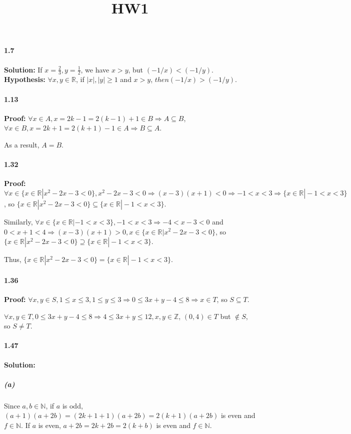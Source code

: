 \documentclass[11pt]{report}
\title{HW1}
\begin{document}
\paragraph{1.7}\textbf{Solution:} If $x = \frac{2}{3}, y = \frac{1}{2}$, we have $x > y$, but $(-1/x) < (-1/y)$.\\

\textbf{Hypothesis:} $\forall x, y \in \mathbb{R}$, if $|x|, |y| \geq 1$ and $x > y$, $then (-1/x) > (-1/y)$.

\paragraph{1.13}\textbf{Proof:}
    $\forall x \in A, x = 2k - 1 = 2(k-1) + 1 \in B \Rightarrow A \subseteq B$, $\forall x \in B, x = 2k + 1 = 2(k + 1) - 1 \in A \Rightarrow B \subseteq A$.
    
    As a result, $A = B$.
\paragraph{1.32}\textbf{Proof:} $\forall x \in \{x \in \mathbb{R} | x^2-2x-3 < 0\}, x^2 - 2x -3 < 0 \Rightarrow (x-3)(x+1) < 0 \Rightarrow -1 < x < 3 \Rightarrow \{x \in \mathbb{R} | -1 < x < 3\}$, so $\{x \in \mathbb{R} | x^2-2x-3 < 0\} \subseteq  \{x \in \mathbb{R} | -1 < x < 3\}$. 

Similarly, $\forall x \in \{x \in \mathbb{R} | -1 < x < 3\}, -1 < x < 3 \Rightarrow  -4 < x-3 < 0$ and $0 < x+1 < 4 \Rightarrow (x-3)(x+1) > 0, x \in \{x \in \mathbb{R} | x^2-2x-3 < 0\}$, so $\{x \in \mathbb{R} | x^2-2x-3 < 0\} \supseteq  \{x \in \mathbb{R} | -1 < x < 3\}$.

Thus, $\{x \in \mathbb{R} | x^2-2x-3 < 0\} = \{x \in \mathbb{R} | -1 < x < 3\}$.
\paragraph{1.36}\textbf{Proof:} $\forall x,y \in S, 1 \leq x \leq 3, 1 \leq y \leq 3 \Rightarrow 0 \leq 3x+y-4 \leq 8 \Rightarrow x \in T$, so $S \subseteq T$.

$\forall x,y \in T, 0 \leq 3x + y - 4 \leq 8 \Rightarrow 4 \leq 3x + y \leq 12, x, y \in \mathbb{Z}$, $(0, 4) \in T$ but $\notin S$, so $S \neq T$. 

\paragraph{1.47}\textbf{Solution:}
    \subparagraph{(a)}Since $a, b \in \mathbb{N}$, if $a$ is odd, $(a+1)(a+2b) = (2k+1+1)(a+2b) = 2(k+1)(a+2b)$ is even and $f \in \mathbb{N}$. If $a$ is even, $a + 2b = 2k + 2b = 2(k+b)$ is even and $f \in \mathbb{N}$.
    
\end{document}
